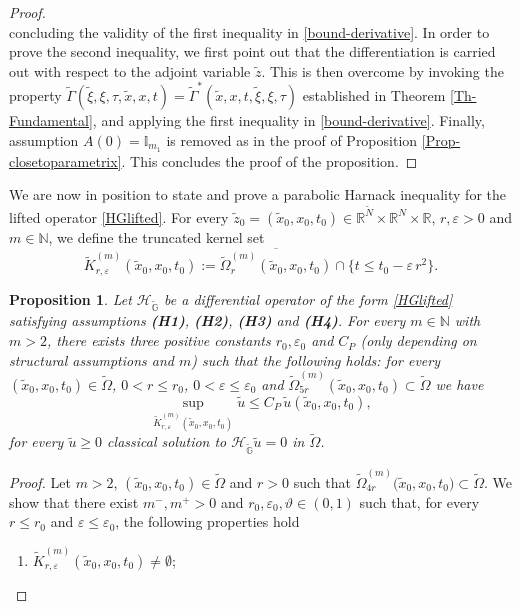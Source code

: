 \documentclass[11pt,a4paper]{article}
\newtheorem{proposition}[theorem]{\bf Proposition}
\numberwithin{equation}{section}
\newcommand{\R}{\mathbb{R}}
\newcommand{\N}{\mathbb{N}}
\def \rn {{\mathbb {R}}^{N}}
\def \rnm {{\mathbb {R}}^{\tilde N}}
\def \tt {\tilde}
\def \GG {{\mathbb{G}}}
\def \ti {\times}
\def \HG {\mathscr{H}_{\tilde\GG}}
\def \G {{\Gamma}}
\def \e {{\varepsilon}}
\def \t {{\tau}}
\def \x {{\xi}}
\def \O {{\Omega}}
\begin{document}
{{\begin{proof}
\begin{equation}
	\end{equation}
	concluding the validity of the first inequality in \eqref{bound-derivative}. In order to prove the second inequality, we first point out that the differentiation is carried out with respect to the adjoint variable $\tt z$. This is then overcome by invoking the property $\tt \G(\tt \x, \x, \t,\tt x, x, t)=\tt \G^*(\tt x, x, t,\tt \x, \x, \t)$ established in Theorem \ref{Th-Fundamental}, and applying the first inequality in \eqref{bound-derivative}.  Finally, assumption $A(0)=\mathbb{I}_{m_1}$ is removed as in the proof of Proposition \eqref{Prop-closetoparametrix}. This concludes the proof of the proposition.	
\end{proof}
We are now in position to state and prove a parabolic Harnack inequality for the lifted operator \eqref{HGlifted}. For every $\tt z_0 = (\tt x_0,x_0, t_0)\in\rnm\ti\rn\ti\R$, $r,\e>0$ and $m\in\N$, we define the truncated kernel set
\begin{equation}\label{ktilde}
	\tt K_{r,\e}^{(m)}(\tt x_0, x_0, t_0):=\overline{\tt \O^{(m)}_r(\tt x_0, x_0, t_0)}\cap \Big\{t\leq t_0 - \e\, r^2\Big\}.
\end{equation}
\begin{proposition}\label{lifted-harnack}
	Let $\HG$ be a differential operator of the form \eqref{HGlifted} satisfying assumptions \textbf{(H1)}, \textbf{(H2)}, \textbf{(H3)} and \textbf{(H4)}. For every $m\in\N$ with $m>2$, there exists three positive constants $r_0,\e_0$ and $C_P$ (only depending on structural assumptions and $m$) such that the following holds: for every $(\tt x_0,x_0, t_0)\in\tt\O$, $0<r\leq r_0$, $0<\e\leq \e_0$ and $\tt\O^{(m)}_{5r}(\tt x_0, x_0, t_0)\subset \tt\O$ we have
	\begin{equation}\label{parabolic-Harnack-lifted}
		\sup_{\tt K_{r,\e}^{(m)}(\tt x_0, x_0, t_0)} \tt u \leq C_P \, \tt u(\tt x_0, x_0, t_0),
	\end{equation}
	for every $\tt u\geq0$ classical solution to $\HG \tt u =0$ in $\tt\O$.
\end{proposition}
\begin{proof}
	Let $m >2$, $(\tt x_0,x_0, t_0)\in\tt\O$ and $r >0$ such that $\tt \O^{(m)}_{4 r}\big(\tt x_0,x_0, t_0\big) \subset \tt \O$. We show that there exist $m^-,m^+>0$ and $r_0,\e_0,\vartheta\in (0,1)$ such that, for every $r\leq r_0$ and $\e\leq \e_0$, the following properties hold
	\begin{enumerate}
		\item $\tt K_{r,\e}^{(m)}(\tt x_0, x_0, t_0)\neq \emptyset$; \label{item1H}

\end{enumerate}
\end{proof}}}
\end{document}
